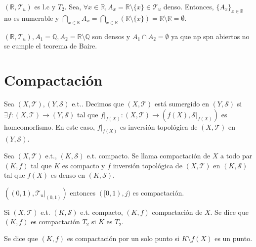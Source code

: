 \begin{ejm}
  $( \mathbb{R}, \mathcal{T}_{u} )$ es l.c y $T_{2}$. Sea, $\forall x \in \mathbb{R}, A_{x} = \mathbb{R} \setminus \{ x \} \in \mathcal{T}_{u}$ denso. Entonces, $\{ A_{x} \}_{x \in \mathbb{R}}$ no es numerable y $\bigcap_{x \in \mathbb{R}} A_{x} = \bigcap_{x \in \mathbb{R}}( \mathbb{R} \setminus \{ x \}) = \mathbb{R} \setminus \mathbb{R} = \emptyset$.
\end{ejm}

\begin{ejm}
  $( \mathbb{R}, \mathcal{T}_{u} ), A_{1} = \mathbb{Q}, A_{2} = \mathbb{R} \setminus \mathbb{Q}$ son densos y $ A_{1} \cap A_{2} = \emptyset$ ya que np spn abiertos no se cumple el teorema de Baire.
\end{ejm}

\section{Compactación}

\begin{defn}
  Sea $( X, \mathcal{T} ), ( Y, \mathcal{S} )$ e.t.. Decimos que $( X, \mathcal{T} )$ está sumergido en $( Y, \mathcal{S} )$ si $\exists f : ( X, \mathcal{T} ) \to ( Y, \mathcal{S} )$ tal que $f|_{f(X)} :  ( X, \mathcal{T} ) \to ( f(X), \mathcal{S}|_{f(X)})$ es homeomorfismo. En este caso, $f|_{f(X)}$ es inversión topológica de $( X, \mathcal{T} )$ en $( Y, \mathcal{S} )$.
\end{defn}

\begin{defn}[Compactación]
  Sea $( X, \mathcal{T} )$ e.t., $( K, \mathcal{S} )$ e.t. compacto. Se llama compactación de $X$ a todo par $(K, f)$ tal que $ K$ es compacto y $f$ inversión topológica de $( X, \mathcal{T} )$ en $( K, \mathcal{S} )$ tal que $f(X)$ es denso en $( K, \mathcal{S} )$.
\end{defn}

\begin{ejm}
  $( (0, 1), \mathcal{T}_{u}|_{(0, 1)})$ entonces $( [0, 1), j )$ es compactación.
\end{ejm}

\begin{defn}[Compactación $T_2$]
  Si $( X, \mathcal{T} )$ e.t. $( K, \mathcal{S} )$ e.t. compacto, $( K, f )$ compactación de $X$. Se dice que $( K, f )$ es compactación $T_{2}$ si $K$ es $T_{2}$.
\end{defn}

\begin{defn}
  Se dice que $( K, f )$ es compactación por un solo punto si $K \setminus f(X)$ es un punto.
\end{defn}

